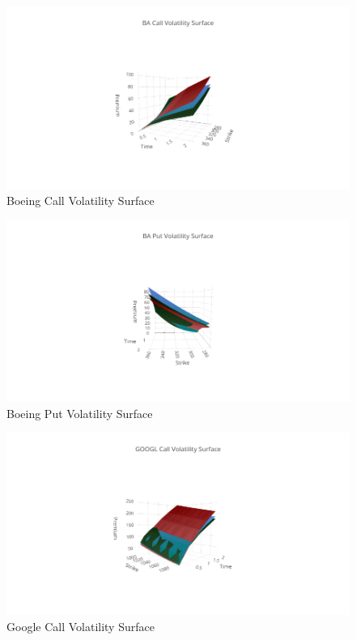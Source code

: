 \documentclass{article}
\begin{document}
\begin{figure}[h!]
\includegraphics[width =\textwidth]{images/VolSurface/BACall.png}
\caption{Boeing Call Volatility Surface}
\centering
\end{figure}
\begin{figure}[h!]
\includegraphics[width =\textwidth]{images/VolSurface/BAPut.png}
\caption{Boeing Put Volatility Surface}
\centering
\end{figure}
\begin{figure}[h!]
\includegraphics[width =\textwidth]{images/VolSurface/GOOGLCall.png}
\caption{Google Call Volatility Surface}
\centering
\end{figure}
\end{document}
